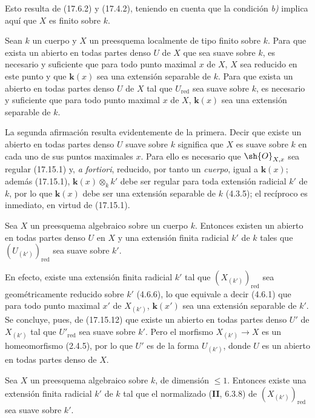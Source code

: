 Esto resulta de (17.6.2) y (17.4.2), teniendo en cuenta que la condición \emph{b)} implica aquí que $X$ es finito sobre $k$.

\begin{proposition}[17.15.12]
\label{IV.17.15.12}
Sean $k$ un cuerpo y $X$ un preesquema localmente de tipo finito sobre $k$. Para que exista un abierto en todas partes denso $U$ de $X$ que sea suave sobre $k$, es necesario y suficiente que para todo punto maximal $x$ de $X$, $X$ sea reducido en este punto y que $\boldsymbol{k}(x)$ sea una extensión separable de $k$. Para que exista un abierto en todas partes denso $U$ de $X$ tal que $U_{\mathrm{red}}$ sea suave sobre $k$, es necesario y suficiente que para todo punto maximal $x$ de $X$, $\boldsymbol{k}(x)$ sea una extensión separable de $k$.
\end{proposition}

La segunda afirmación resulta evidentemente de la primera. Decir que existe un abierto en todas partes denso $U$ suave sobre $k$ significa que $X$ es suave sobre $k$ en cada uno de sus puntos maximales $x$. Para ello es necesario que $\sh{O}_{X,x}$ sea regular (17.15.1) y, \emph{a fortiori}, reducido, por tanto un \emph{cuerpo}, igual a $\boldsymbol{k}(x)$; además (17.15.1), $\boldsymbol{k}(x)\otimes_k k'$ debe ser regular para toda extensión radicial $k'$ de $k$, por lo que $\boldsymbol{k}(x)$ debe ser una extensión separable de $k$ (4.3.5); el recíproco es inmediato, en virtud de (17.15.1).

\begin{corollary}[17.15.13]
\label{IV.17.15.13}
Sea $X$ un preesquema algebraico sobre un cuerpo $k$. Entonces existen un abierto en todas partes denso $U$ en $X$ y una extensión finita radicial $k'$ de $k$ tales que $(U_{(k')})_{\mathrm{red}}$ sea suave sobre $k'$.
\end{corollary}

En efecto, existe una extensión finita radicial $k'$ tal que $(X_{(k')})_{\mathrm{red}}$ sea geométricamente reducido sobre $k'$ (4.6.6), lo que equivale a decir (4.6.1) que para todo punto maximal $x'$ de $X_{(k')}$, $\boldsymbol{k}(x')$ sea una extensión separable de $k'$. Se concluye, pues, de (17.15.12) que existe un abierto en todas partes denso $U'$ de $X_{(k')}$ tal que $U'_{\mathrm{red}}$ sea suave sobre $k'$. Pero el morfismo $X_{(k')}\to X$ es un homeomorfismo (2.4.5), por lo que $U'$ es de la forma $U_{(k')}$, donde $U$ es un abierto en todas partes denso de $X$.

\begin{proposition}[17.15.14]
\label{IV.17.15.14}
Sea $X$ un preesquema algebraico sobre $k$, de dimensión $\leq1$. Entonces existe una extensión finita radicial $k'$ de $k$ tal que el normalizado \textup{(\textbf{II}, 6.3.8)} de $(X_{(k')})_{\mathrm{red}}$ sea suave sobre $k'$.
\end{proposition}

